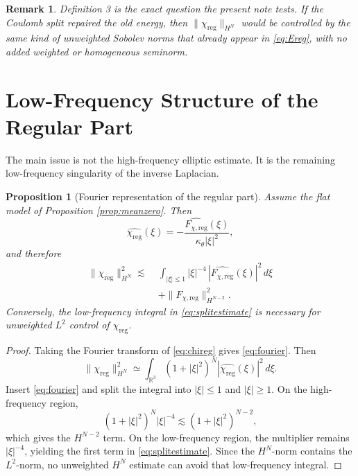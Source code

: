 \documentclass[11pt]{article}
\newtheorem{proposition}{Proposition}
\newtheorem{remark}{Remark}
\begin{document}
\begin{remark}
Definition 3 is the exact question the present note tests. If the Coulomb split repaired the old energy, then \(\|\chi_{\mathrm{reg}}\|_{H^N}\) would be controlled by the same kind of unweighted Sobolev norms that already appear in \eqref{eq:Ereg}, with no added weighted or homogeneous seminorm.
\end{remark}

\section{Low-Frequency Structure of the Regular Part}

The main issue is not the high-frequency elliptic estimate. It is the remaining low-frequency singularity of the inverse Laplacian.

\begin{proposition}[Fourier representation of the regular part]
\label{prop:fourier}
Assume the flat model of Proposition \ref{prop:meanzero}. Then
\begin{equation}
\widehat{\chi_{\mathrm{reg}}}(\xi)
=
-\frac{\widehat{F_{\chi,\mathrm{reg}}}(\xi)}{\kappa_\theta |\xi|^2},
\label{eq:fourier}
\end{equation}
and therefore
\begin{align}
\|\chi_{\mathrm{reg}}\|_{H^N}^2
\lesssim\;&
\int_{|\xi|\le 1}
|\xi|^{-4}\,|\widehat{F_{\chi,\mathrm{reg}}}(\xi)|^2\,d\xi
\nonumber\\
&+
\|F_{\chi,\mathrm{reg}}\|_{H^{N-2}}^2.
\label{eq:splitestimate}
\end{align}
Conversely, the low-frequency integral in \eqref{eq:splitestimate} is necessary for unweighted \(L^2\) control of \(\chi_{\mathrm{reg}}\).
\end{proposition}

\begin{proof}
Taking the Fourier transform of \eqref{eq:chireg} gives \eqref{eq:fourier}. Then
\[
\|\chi_{\mathrm{reg}}\|_{H^N}^2
\simeq
\int_{\mathbb R^3}
(1+|\xi|^2)^N |\widehat{\chi_{\mathrm{reg}}}(\xi)|^2\,d\xi.
\]
Insert \eqref{eq:fourier} and split the integral into \(|\xi|\le 1\) and \(|\xi|\ge 1\). On the high-frequency region,
\[
(1+|\xi|^2)^N |\xi|^{-4}
\lesssim
(1+|\xi|^2)^{N-2},
\]
which gives the \(H^{N-2}\) term. On the low-frequency region, the multiplier remains \(|\xi|^{-4}\), yielding the first term in \eqref{eq:splitestimate}. Since the \(H^N\)-norm contains the \(L^2\)-norm, no unweighted \(H^N\) estimate can avoid that low-frequency integral.
\end{proof}
\end{document}
